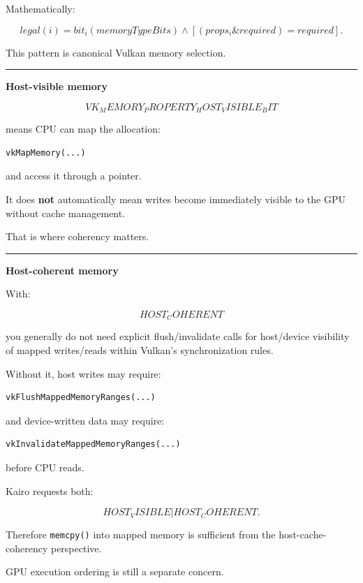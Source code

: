 Mathematically:

\[
\boxed{
legal(i)
=
bit_i(memoryTypeBits)
\land
[(props_i\&required)=required].
}
\]

This pattern is canonical Vulkan memory selection.

\begin{center}\rule{0.5\linewidth}{0.5pt}\end{center}

\textbf{Host-visible memory}

\[
VK_MEMORY_PROPERTY_HOST_VISIBLE_BIT
\]

means CPU can map the allocation:

\begin{verbatim}
vkMapMemory(...)
\end{verbatim}

and access it through a pointer.

It does \textbf{not} automatically mean writes become immediately visible to the GPU without cache management.

That is where coherency matters.

\begin{center}\rule{0.5\linewidth}{0.5pt}\end{center}

\textbf{Host-coherent memory}

With:

\[
HOST_COHERENT
\]

you generally do not need explicit flush/invalidate calls for host/device visibility of mapped writes/reads within Vulkan's synchronization rules.

Without it, host writes may require:

\begin{verbatim}
vkFlushMappedMemoryRanges(...)
\end{verbatim}

and device-written data may require:

\begin{verbatim}
vkInvalidateMappedMemoryRanges(...)
\end{verbatim}

before CPU reads.

Kairo requests both:

\[
HOST_VISIBLE
|
HOST_COHERENT.
\]

Therefore \texttt{memcpy()} into mapped memory is sufficient from the host-cache-coherency perspective.

GPU execution ordering is still a separate concern.

